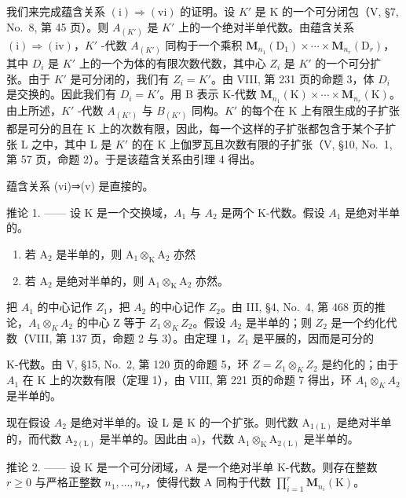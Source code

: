 我们来完成蕴含关系 \((\mathrm{i})\Rightarrow(\mathrm{vi})\) 的证明。设 \(K'\) 是 K 的一个可分闭包（V, §7, No.~8, 第 45 页）。则 \(A_{(K')}\) 是 \(K'\) 上的一个绝对半单代数。由蕴含关系 \((\mathrm{i})\Rightarrow(\mathrm{iv})\)，\(K'\) -代数 \(A_{(K')}\) 同构于一个乘积 \(\mathbf{M}_{n_{1}}(\mathrm{D}_{1})\times\cdots\times\mathbf{M}_{n_{r}}(\mathrm{D}_{r})\)，其中 \(D_{i}\) 是 \(K'\) 上的一个为体的有限次数代数，其中心 \(Z_{i}\) 是 \(K'\) 的一个可分扩张。由于 \(K'\) 是可分闭的，我们有 \(Z_{i}=K'\)。由 VIII, 第 231 页的命题 3，体 \(D_{i}\) 是交换的。因此我们有 \(D_{i}=K'\)。用 B 表示 K-代数 \(\mathbf{M}_{n_{1}}(\mathrm{K})\times\cdots\times\mathbf{M}_{n_{r}}(\mathrm{K})\)。由上所述，\(K'\) -代数 \(A_{(K')}\) 与 \(B_{(K')}\) 同构。\(K'\) 的每个在 K 上有限生成的子扩张都是可分的且在 K 上的次数有限，因此，每一个这样的子扩张都包含于某个子扩张 L 之中，其中 L 是 \(K'\) 的在 K 上伽罗瓦且次数有限的子扩张（V, §10, No.~1, 第 57 页，命题 2）。于是该蕴含关系由引理 4 得出。

蕴含关系 (vi)⇒(v) 是直接的。

推论 1. —— 设 K 是一个交换域，\(A_{1}\) 与 \(A_{2}\) 是两个 K-代数。假设 \(A_{1}\) 是绝对半单的。

\begin{enumerate}
\def\labelenumi{\alph{enumi})}
\item
  若 \(\mathrm{A}_2\) 是半单的，则 \(\mathrm{A}_1\otimes_{\mathrm{K}}\mathrm{A}_2\) 亦然
\item
  若 \(\mathrm{A}_2\) 是绝对半单的，则 \(\mathrm{A}_1\otimes_{\mathrm{K}}\mathrm{A}_2\) 亦然。
\end{enumerate}

把 \(A_{1}\) 的中心记作 \(Z_{1}\)，把 \(A_{2}\) 的中心记作 \(Z_{2}\)。由 III, §4, No.~4, 第 468 页的推论，\(A_{1} \otimes_{K} A_{2}\) 的中心 Z 等于 \(Z_{1} \otimes_{K} Z_{2}\)。假设 \(A_{2}\) 是半单的；则 \(Z_{2}\) 是一个约化代数（VIII, 第 137 页，命题 2 与 3）。由定理 1，\(Z_{1}\) 是平展的，因而是可分的

K-代数。由 V, §15, No.~2, 第 120 页的命题 5，环 \(Z = Z_{1} \otimes_{K} Z_{2}\) 是约化的；由于 \(A_{1}\) 在 K 上的次数有限（定理 1），由 VIII, 第 221 页的命题 7 得出，环 \(A_{1} \otimes_{K} A_{2}\) 是半单的。

现在假设 \(A_{2}\) 是绝对半单的。设 L 是 K 的一个扩张。则代数 \(\mathrm{A}_{1(\mathrm{L})}\) 是绝对半单的，而代数 \(\mathrm{A}_{2(\mathrm{L})}\) 是半单的。因此由 a)，代数 \(\mathrm{A}_{1} \otimes_{\mathrm{K}} \mathrm{A}_{2(\mathrm{L})}\) 是半单的。

推论 2. —— 设 K 是一个可分闭域，A 是一个绝对半单 K-代数。则存在整数 \(r \geqslant 0\) 与严格正整数 \(n_{1}, \ldots, n_{r}\)，使得代数 A 同构于代数 \(\prod_{i=1}^{r} \mathbf{M}_{n_{i}}(\mathrm{K})\)。


